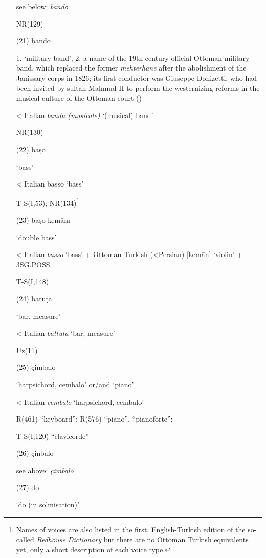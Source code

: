 \documentclass[output=paper,colorlinks,citecolor=brown,arabicfont,chinesefont]{langscibook}
\begin{document}
\begin{itemize}
    see below: \emph{bando}

    NR(129)
    \item[(21)] bando {}

    1. ‘military band’, 2. a name of the 19th-century official Ottoman military band, which replaced the former \emph{mehterhane} after the abolishment of the Janissary corps in 1826; its first conductor was Giuseppe Donizetti, who had been invited by sultan Mahmud II to perform the westernizing reforms in the musical culture of the Ottoman court (\citealt{Araci2002,Araci2006})

    < Italian \emph{banda (musicale)} ‘(musical) band’ 

    NR(130)
    \item[(22)] baṣo {}
    
    ‘bass’
    
    < Italian basso ‘bass’

    T-S(I,53); NR(134)\footnote{Names of voices are also listed in the first, English-Turkish edition of the so-called \emph{Redhouse Dictionary} \citep{Redhouse1861} but there are no Ottoman Turkish equivalents yet, only a short description of each voice type.}
    \item[(23)] baṣo kemānı {}

    ‘double bass’

    < Italian \emph{basso} ‘bass’ + Ottoman Turkish (<Persian) {} [kemān] ‘violin’ + 3SG.POSS

    T-S(I,148) 
    \item[(24)] batuṭa {}

    ‘bar, measure’

    < Italian \emph{battuta} ‘bar, measure’

    Uz(11)
    \item[(25)] çimbalo {}

    ‘harpsichord, cembalo’ or/and ‘piano’

    < Italian \emph{cembalo} ‘harpsichord, cembalo’	

    R(461) “keyboard”; R(576) “piano”, “pianoforte”; 

    T-S(I,120) “clavicorde”
    \item[(26)] çinbalo {}
    
    see above: \emph{çimbalo}
    \item[(27)] do {}
    
    ‘do (in solmisation)’


\end{itemize}
\end{document}
